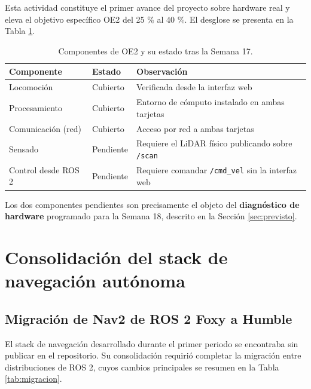 \documentclass[12pt,letterpaper]{article}
\begin{document}
Esta actividad constituye el primer avance del proyecto sobre hardware real y eleva el objetivo específico OE2 del 25 \% al 40 \%. El desglose se presenta en la Tabla \ref{tab:oe2}.

\begin{table}[H]
    \centering
    \small
    \caption{Componentes de OE2 y su estado tras la Semana 17.}
    \label{tab:oe2}
    \begin{tabular}{@{}lll@{}}
        \toprule
        \textbf{Componente} & \textbf{Estado} & \textbf{Observación} \\ \midrule
        Locomoción        & Cubierto  & Verificada desde la interfaz web \\
        Procesamiento     & Cubierto  & Entorno de cómputo instalado en ambas tarjetas \\
        Comunicación (red) & Cubierto  & Acceso por red a ambas tarjetas \\
        Sensado           & Pendiente & Requiere el LiDAR físico publicando sobre \texttt{/scan} \\
        Control desde ROS 2 & Pendiente & Requiere comandar \texttt{/cmd\_vel} sin la interfaz web \\ \bottomrule
    \end{tabular}
\end{table}

Los dos componentes pendientes son precisamente el objeto del \textbf{diagnóstico de hardware} programado para la Semana 18, descrito en la Sección \ref{sec:previsto}.

\section{Consolidación del stack de navegación autónoma}

\subsection{Migración de Nav2 de ROS 2 Foxy a Humble}

El stack de navegación desarrollado durante el primer periodo se encontraba sin publicar en el repositorio. Su consolidación requirió completar la migración entre distribuciones de ROS 2, cuyos cambios principales se resumen en la Tabla \ref{tab:migracion}.
\end{document}
